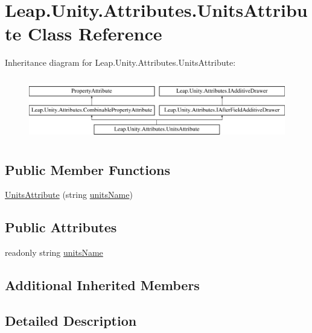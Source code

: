 \hypertarget{class_leap_1_1_unity_1_1_attributes_1_1_units_attribute}{}\section{Leap.\+Unity.\+Attributes.\+Units\+Attribute Class Reference}
\label{class_leap_1_1_unity_1_1_attributes_1_1_units_attribute}
Inheritance diagram for Leap.\+Unity.\+Attributes.\+Units\+Attribute\+:\begin{figure}[H]
\begin{center}
\leavevmode
\includegraphics[height=2.772277cm]{class_leap_1_1_unity_1_1_attributes_1_1_units_attribute}
\end{center}
\end{figure}
\subsection*{Public Member Functions}
\begin{DoxyCompactItemize}
\item 
\mbox{\hyperlink{class_leap_1_1_unity_1_1_attributes_1_1_units_attribute_a80e332e4a8268c37e1c90ce5b49fe0f1}{Units\+Attribute}} (string \mbox{\hyperlink{class_leap_1_1_unity_1_1_attributes_1_1_units_attribute_a58a9a2fd9ed58c81f9e3beeb637b8a74}{units\+Name}})
\end{DoxyCompactItemize}
\subsection*{Public Attributes}
\begin{DoxyCompactItemize}
\item 
readonly string \mbox{\hyperlink{class_leap_1_1_unity_1_1_attributes_1_1_units_attribute_a58a9a2fd9ed58c81f9e3beeb637b8a74}{units\+Name}}
\end{DoxyCompactItemize}
\subsection*{Additional Inherited Members}


\subsection{Detailed Description}


